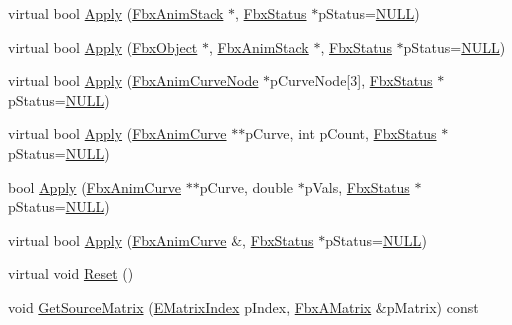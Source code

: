 \begin{DoxyCompactItemize}
\item 
virtual bool \hyperlink{class_fbx_anim_curve_filter_matrix_converter_a20db5fcf27096c750a9b5bfc1ed074e4}{Apply} (\hyperlink{class_fbx_anim_stack}{Fbx\+Anim\+Stack} $\ast$, \hyperlink{class_fbx_status}{Fbx\+Status} $\ast$p\+Status=\hyperlink{fbxarch_8h_a070d2ce7b6bb7e5c05602aa8c308d0c4}{N\+U\+LL})
\item 
virtual bool \hyperlink{class_fbx_anim_curve_filter_matrix_converter_a9159d911dfa550f7760ffbb1e3b6cb6b}{Apply} (\hyperlink{class_fbx_object}{Fbx\+Object} $\ast$, \hyperlink{class_fbx_anim_stack}{Fbx\+Anim\+Stack} $\ast$, \hyperlink{class_fbx_status}{Fbx\+Status} $\ast$p\+Status=\hyperlink{fbxarch_8h_a070d2ce7b6bb7e5c05602aa8c308d0c4}{N\+U\+LL})
\item 
virtual bool \hyperlink{class_fbx_anim_curve_filter_matrix_converter_a75ed2f9079858c1db98740c3fa0506e9}{Apply} (\hyperlink{class_fbx_anim_curve_node}{Fbx\+Anim\+Curve\+Node} $\ast$p\+Curve\+Node\mbox{[}3\mbox{]}, \hyperlink{class_fbx_status}{Fbx\+Status} $\ast$p\+Status=\hyperlink{fbxarch_8h_a070d2ce7b6bb7e5c05602aa8c308d0c4}{N\+U\+LL})
\item 
virtual bool \hyperlink{class_fbx_anim_curve_filter_matrix_converter_a30599e88b210af2fa8c7be727d59fae8}{Apply} (\hyperlink{class_fbx_anim_curve}{Fbx\+Anim\+Curve} $\ast$$\ast$p\+Curve, int p\+Count, \hyperlink{class_fbx_status}{Fbx\+Status} $\ast$p\+Status=\hyperlink{fbxarch_8h_a070d2ce7b6bb7e5c05602aa8c308d0c4}{N\+U\+LL})
\item 
bool \hyperlink{class_fbx_anim_curve_filter_matrix_converter_adfcd53e23b1a55da02892b7ecf3822b3}{Apply} (\hyperlink{class_fbx_anim_curve}{Fbx\+Anim\+Curve} $\ast$$\ast$p\+Curve, double $\ast$p\+Vals, \hyperlink{class_fbx_status}{Fbx\+Status} $\ast$p\+Status=\hyperlink{fbxarch_8h_a070d2ce7b6bb7e5c05602aa8c308d0c4}{N\+U\+LL})
\item 
virtual bool \hyperlink{class_fbx_anim_curve_filter_matrix_converter_a33ffa3eacf298e44aeaaec44db9bdd26}{Apply} (\hyperlink{class_fbx_anim_curve}{Fbx\+Anim\+Curve} \&, \hyperlink{class_fbx_status}{Fbx\+Status} $\ast$p\+Status=\hyperlink{fbxarch_8h_a070d2ce7b6bb7e5c05602aa8c308d0c4}{N\+U\+LL})
\item 
virtual void \hyperlink{class_fbx_anim_curve_filter_matrix_converter_ad441f2753722fa3fd07631fb249afadb}{Reset} ()
\item 
void \hyperlink{class_fbx_anim_curve_filter_matrix_converter_a38313c4b68b33172198ca19ef957bc1c}{Get\+Source\+Matrix} (\hyperlink{class_fbx_anim_curve_filter_matrix_converter_a41638d5acd6d14ef0f095ab75b18ee69}{E\+Matrix\+Index} p\+Index, \hyperlink{class_fbx_a_matrix}{Fbx\+A\+Matrix} \&p\+Matrix) const

\end{DoxyCompactItemize}
